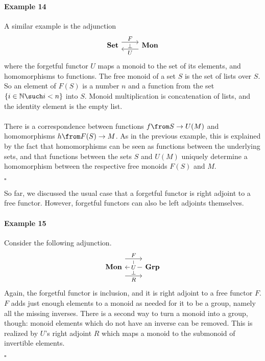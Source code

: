 \paragraph{Example 14} 
	A similar example is the adjunction
	 \[ \begin{tikzcd}	
	[ampersand replacement=\&, every label/.append style = {font = \footnotesize}]
	\textbf{Set} \arrow[r, shift left=2,"F","\bot"']
	\& \textbf{Mon} \arrow[l, shift left=2, "U"]
	\end{tikzcd} \]
	 where the forgetful functor $U$ maps a monoid to the set of its elements, and homomorphisms to functions. The free monoid of a set $S$ is the set of lists over $S$. So an element of $F(S)$ is a number $n$ and a function from the set $\{i \in \mathbb N \such i < n\}$ into $S$. Monoid multiplication is concatenation of lists, and the identity element is the empty list.\\\\
	 There is a correspondence between functions $f \from S \to U(M)$ and homomorphisms $h \from F(S) \to M$. As in the previous example, this is explained by the fact that homomorphisms can be seen as functions between the underlying sets, and that functions between the sets $S$ and $U(M)$ uniquely determine a homomorphism between the respective free monoids $F(S)$ and $M$.{\begin{flushright}$\square$\end{flushright}}\vspace{\baselineskip}
	So far, we discussed the usual case that a forgetful functor is right adjoint to a free functor. However, forgetful functors can also be left adjoints themselves. \\
\paragraph{Example 15} Consider the following adjunction.
	\[\begin{tikzcd}	
	[ampersand replacement=\&, every label/.append style = {font = \footnotesize}]
	\textbf{Mon} \arrow[r, shift left=5,"F","\bot"'] \arrow[r, shift right=5,"\bot","R"']
	\& \textbf{Grp} \arrow[l, shift left=0, "U" description]
	\end{tikzcd}\] Again, the forgetful functor is inclusion, and it is right adjoint to a free functor $F$. $F$ adds just enough elements to a monoid as needed for it to be a group, namely all the missing inverses. There is a second way to turn a monoid into a group, though: monoid elements which do not have an inverse can be removed. This is realized by $U$'s right adjoint $R$ which maps a monoid to the submonoid of invertible elements. {\begin{flushright}$\square$\end{flushright}}\vspace{\baselineskip}
